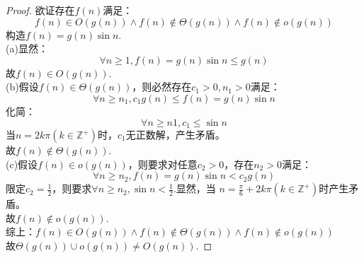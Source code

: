 \begin{proof}
    欲证存在$f(n)$满足：
    $$f(n) \in O(g(n)) \wedge f(n) \notin \Theta(g(n)) \wedge f(n) \notin o(g(n))$$
    构造$f(n)=g(n)\sin n$.\\

    (a)显然：
    $$\forall n \ge 1, f(n) = g(n)\sin n \le g(n)$$
    故$f(n) \in O(g(n))$.\\

    (b)假设$f(n) \in \Theta(g(n))$，则必然存在$c_1>0,n_1>0$满足：
    $$\forall n \ge n_1, c_1g(n) \le f(n) = g(n) \sin n $$
    化简：
    $$\forall n \ge n1, c_1 \le \sin n$$
    当$n=2k\pi(k \in \mathbb Z^+)$时，$c_1$无正数解，产生矛盾。\\
    故$f(n) \notin \Theta(g(n))$.\\

    (c)假设$f(n) \in o(g(n))$，则要求对任意$c_2>0$，存在$n_2>0$满足：
    $$\forall n \ge n_2, f(n) = g(n)\sin n < c_2g(n)$$
    限定$c_2=\frac{1}{2}$，则要求$\forall n \ge n_2, \sin n < \frac{1}{2}$.显然，当
    $n=\frac{\pi}{6}+2k\pi(k \in \mathbb Z^+)$时产生矛盾。\\
    故$f(n) \notin o(g(n))$.\\
    \bigskip
    综上：$f(n) \in O(g(n)) \wedge f(n) \notin \Theta(g(n)) \wedge f(n) \notin o(g(n))$\\
    故$\Theta(g(n)) \cup o(g(n)) \neq O(g(n))$.

\end{proof}
